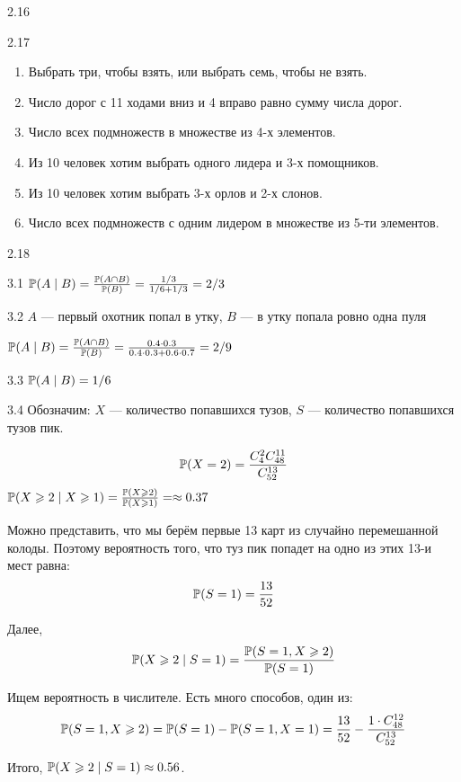 \protect \hypertarget {soln:2.16}{}
\begin{solution}{{2.16}}
\end{solution}
\protect \hypertarget {soln:2.17}{}
\begin{solution}{{2.17}}
\begin{enumerate}
  \item Выбрать три, чтобы взять, или выбрать семь, чтобы не взять.
  \item Число дорог с 11 ходами вниз и 4 вправо равно сумму числа дорог.
  \item Число всех подмножеств в множестве из 4-х элементов.
  \item Из 10 человек хотим выбрать одного лидера и 3-х помощников.
  \item Из 10 человек хотим выбрать 3-х орлов и 2-х слонов.
  \item Число всех подмножеств с одним лидером в множестве из 5-ти элементов.
\end{enumerate}

\end{solution}
\protect \hypertarget {soln:2.18}{}
\begin{solution}{{2.18}}
\end{solution}
\protect \hypertarget {soln:3.1}{}
\begin{solution}{{3.1}}
  $\P(A\mid B)=\frac{\P(A \cap B)}{\P(B)}= \frac{1/3}{1/6+1/3}=2/3$
\end{solution}
\protect \hypertarget {soln:3.2}{}
\begin{solution}{{3.2}}
  $A$ — первый охотник попал в утку, $B$ — в утку попала ровно одна пуля

  $\P(A \mid B)=\frac{\P(A \cap B)}{\P(B)}= \frac{0.4 \cdot 0.3 }{0.4\cdot 0.3 + 0.6\cdot 0.7}=2/9$
\end{solution}
\protect \hypertarget {soln:3.3}{}
\begin{solution}{{3.3}}
  $\P(A \mid B)=1/6$
\end{solution}
\protect \hypertarget {soln:3.4}{}
\begin{solution}{{3.4}}
Обозначим: $X$ — количество попавшихся тузов, $S$ — количество попавшихся тузов пик.

\[
\P(X = 2) = \frac{C_4^2 C_{48}^{11}}{C_{52}^{13}}
\]
$\P(X\geq 2 \mid X\geq 1)=\frac{\P(X \geq 2)}{\P(X \geq 1)}= \approx 0.37$


Можно представить, что мы берём первые 13 карт из случайно перемешанной колоды.
Поэтому вероятность того, что туз пик попадет на одно из этих 13-и мест равна:
\[
\P(S=1) = \frac{13}{52}
\]

Далее,
\[
\P(X\geq 2 \mid S = 1) = \frac{\P(S=1, X\geq 2)}{\P(S=1)}
\]

Ищем вероятность в числителе. Есть много способов, один из:
\[
\P(S=1, X\geq 2) = \P(S=1) - \P(S=1, X=1) = \frac{13}{52} - \frac{1\cdot C_{48}^{12}}{C_{52}^{13}}
\]

Итого, $\P(X \geq 2 \mid S = 1) \approx 0.56$.

\end{solution}
